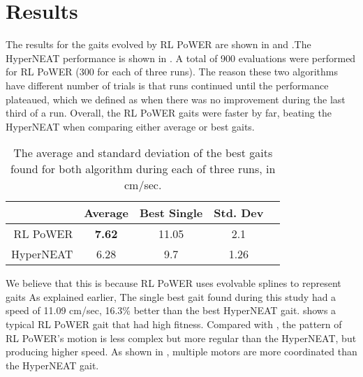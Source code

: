 \section{Results}
The results for the gaits evolved by RL PoWER are shown in  and .The HyperNEAT performance is shown in . A total of 900 evaluations were performed for RL PoWER (300 for each of three runs). The reason these two algorithms have different number of trials is that runs continued until the performance plateaued, which we defined as when there was no improvement during the last third of a run. Overall, the RL PoWER gaits were
faster by far, beating the HyperNEAT when comparing
either average or best gaits.


\begin{table}
\begin{center}
\begin{tabular}{|r|c|c|c||c|}
\hline
                                & Average & Best Single & Std. Dev \\
\hline                                    
\hline                                    
RL PoWER                       & {\bf 7.62}  & 11.05  &    2.1   \\
\hline
HyperNEAT                      & 6.28   & 9.7 & 1.26   \\
\hline
\end{tabular}
\caption{The average and standard deviation of the best gaits found
  for both algorithm during each of three runs, in cm/sec.}
\end{center}
\end{table}



We believe that this is because RL PoWER uses evolvable splines to represent gaits As explained earlier,  
The single best gait found during this study had a speed of 11.09 cm/sec,  16.3\% better than the best HyperNEAT gait.  shows a typical RL PoWER gait that had high fitness. Compared with , the pattern of RL PoWER's motion is less
complex but more regular than the HyperNEAT, but producing higher speed. As shown in 
, multiple motors are more coordinated than the HyperNEAT gait.

